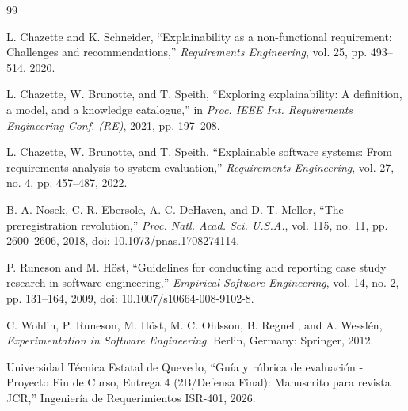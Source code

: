 \documentclass[9pt,a4paper]{extarticle}
\begin{document}
\begin{thebibliography}{99}

L. Chazette and K. Schneider, ``Explainability as a non-functional requirement: Challenges and recommendations,'' \textit{Requirements Engineering}, vol. 25, pp. 493--514, 2020.

L. Chazette, W. Brunotte, and T. Speith, ``Exploring explainability: A definition, a model, and a knowledge catalogue,'' in \textit{Proc. IEEE Int. Requirements Engineering Conf. (RE)}, 2021, pp. 197--208.

L. Chazette, W. Brunotte, and T. Speith, ``Explainable software systems: From requirements analysis to system evaluation,'' \textit{Requirements Engineering}, vol. 27, no. 4, pp. 457--487, 2022.

B. A. Nosek, C. R. Ebersole, A. C. DeHaven, and D. T. Mellor, ``The preregistration revolution,'' \textit{Proc. Natl. Acad. Sci. U.S.A.}, vol. 115, no. 11, pp. 2600--2606, 2018, doi: 10.1073/pnas.1708274114.

P. Runeson and M. Höst, ``Guidelines for conducting and reporting case study research in software engineering,'' \textit{Empirical Software Engineering}, vol. 14, no. 2, pp. 131--164, 2009, doi: 10.1007/s10664-008-9102-8.

C. Wohlin, P. Runeson, M. Höst, M. C. Ohlsson, B. Regnell, and A. Wesslén, \textit{Experimentation in Software Engineering}. Berlin, Germany: Springer, 2012.

Universidad Técnica Estatal de Quevedo, ``Guía y rúbrica de evaluación - Proyecto Fin de Curso, Entrega 4 (2B/Defensa Final): Manuscrito para revista JCR,'' Ingeniería de Requerimientos ISR-401, 2026.

\end{thebibliography}
\end{document}
